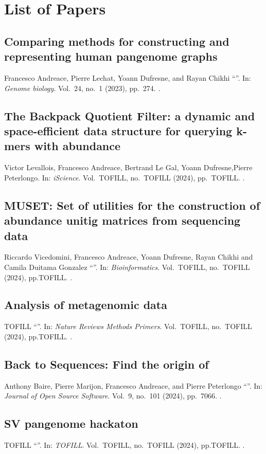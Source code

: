 \chapter{List of Papers}


\section*{Comparing methods for constructing and representing human pangenome graphs}
Francesco Andreace, Pierre Lechat, Yoann Dufresne, and Rayan Chikhi
\enquote{}.
In: \emph{Genome biology}.
Vol.\ 24,
no.\ 1
(2023),
pp.~274.
.

\section*{The Backpack Quotient Filter: a dynamic and space-efficient data structure for querying k-mers with abundance}
Victor Levallois, Francesco Andreace, Bertrand Le Gal, Yoann Dufresne,Pierre Peterlongo.
In: \emph{iScience}.
Vol.\ TOFILL,
no.\ TOFILL
(2024),
pp.~TOFILL.
.


\section*{MUSET: Set of utilities for the construction of abundance unitig matrices from sequencing data}
Riccardo Vicedomini, Francesco Andreace, Yoann Dufresne, Rayan Chikhi and Camila Duitama Gonzalez 
\enquote{}.
In: \emph{Bioinformatics}.
Vol.\ TOFILL,
no.\ TOFILL
(2024),
pp.TOFILL.
.

\section*{Analysis of metagenomic data}
TOFILL
\enquote{}.
In: \emph{Nature Reviews Methods Primers}.
Vol.\ TOFILL,
no.\ TOFILL
(2024),
pp.TOFILL.
.


\section*{Back to Sequences: Find the origin of \kmers}
Anthony Baire, Pierre Marijon, Francesco Andreace, and Pierre
Peterlongo 
\enquote{}.
In: \emph{Journal of Open Source Software}.
Vol.\ 9,
no.\ 101
(2024),
pp.~7066.
.



\section*{SV pangenome hackaton}
TOFILL
\enquote{}.
In: \emph{TOFILL}.
Vol.\ TOFILL,
no.\ TOFILL
(2024),
pp.TOFILL.
.